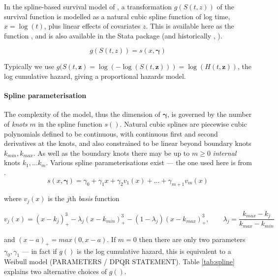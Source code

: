 \documentclass[nojss,nofooter]{jss}
\begin{document}
In the spline-based survival model of \citet{royston:parmar}, a
transformation $g(S(t,z))$ of the survival function is modelled as a
natural cubic spline function of log time, $x = \log(t)$, plus linear
effects of covariates $z$.  This is available here as the function
,  and is also available in the Stata package
 \citep{stpm2} (and historically , \citet{stpm:orig,stpm:update}).

  \[g(S(t,z)) = s(x, \bm{\gamma})\]

Typically we use $g(S(t,\mathbf{z}) = \log(-\log(S(t,\mathbf{z}))) =
\log(H(t,\mathbf{z}))$, the log cumulative hazard, giving a
proportional hazards model.    

\paragraph{Spline parameterisation}
The complexity of the model, thus the dimension of $\bm{\gamma}$, is
governed by the number of \emph{knots} $m$ in the spline function
$s()$.  Natural cubic splines are piecewise cubic polynomials defined
to be continuous, with continuous first and second derivatives at the
knots, and also constrained to be linear beyond boundary knots
$k_{min},k_{max}$.  As well as the boundary knots there may be up to
$m\geq 0$ \emph{internal} knots $k_1,\ldots k_m$.  Various spline
parameterisations exist --- the one used here is from
\citet{royston:parmar}.
\begin{equation}
  \label{eq:spline}
  s(x,\bm{\gamma}) = \gamma_0 + \gamma_1 x + \gamma_2 v_1(x) + \ldots + \gamma_{m+1} v_m(x)   
\end{equation}


where $v_j(x)$ is the $j$th \emph{basis} function

\[v_j(x) = (x - k_j)^3_+ - \lambda_j(x - k_{min})^3_+ - (1 - \lambda_j) (x - k_{max})^3_+, 
\qquad
\lambda_j = \frac{k_{max} - k_j}{k_{max} - k_{min}} \] 

and $(x - a)_+ = max(0, x - a)$.  If $m=0$ then there are only two
parameters $\gamma_0,\gamma_1$ --- in fact if $g()$ is the log
cumulative hazard, this is equivalent to a Weibull model (PARAMETERS /
DPQR STATEMENT).  Table \ref{tab:spline} explains two alternative
choices of $g()$.
  
\end{document}
